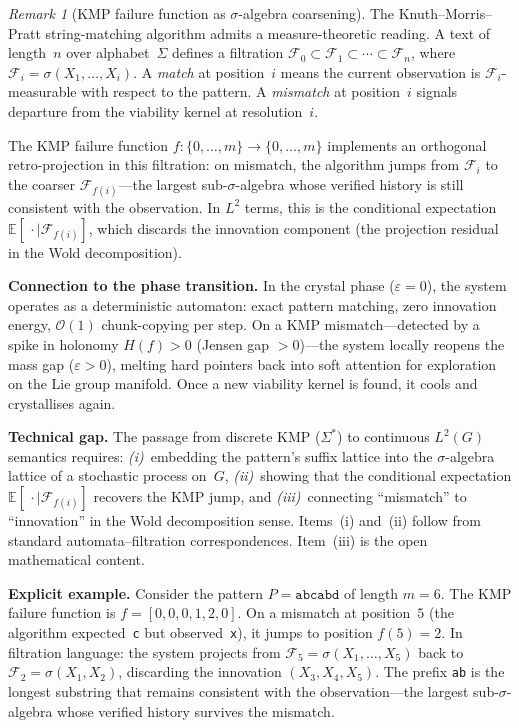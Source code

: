 \documentclass[11pt,a4paper]{article}
\theoremstyle{definition}
\theoremstyle{remark}
\newtheorem{remark}[theorem]{Remark}
\begin{document}
\begin{remark}[KMP failure function as $\sigma$-algebra coarsening]
\label{rmk:kmp}
The Knuth--Morris--Pratt string-matching algorithm admits a
measure-theoretic reading. A text of length~$n$ over alphabet~$\Sigma$
defines a filtration
$\mathcal{F}_0 \subset \mathcal{F}_1 \subset \cdots \subset \mathcal{F}_n$,
where $\mathcal{F}_i = \sigma(X_1,\dots,X_i)$.
A \emph{match} at position~$i$ means the current observation is
$\mathcal{F}_i$-measurable with respect to the pattern.
A \emph{mismatch} at position~$i$ signals departure from the viability
kernel at resolution~$i$.

The KMP failure function $f\colon\{0,\dots,m\}\to\{0,\dots,m\}$
implements an orthogonal retro-projection in this filtration:
on mismatch, the algorithm jumps from $\mathcal{F}_i$ to the coarser
$\mathcal{F}_{f(i)}$---the largest sub-$\sigma$-algebra whose
verified history is still consistent with the observation.
In $L^2$ terms, this is the conditional expectation
$\mathbb{E}[\,\cdot\mid\mathcal{F}_{f(i)}]$,
which discards the innovation component
(the projection residual in the Wold decomposition).

\medskip\noindent\textbf{Connection to the phase transition.}
In the crystal phase ($\varepsilon = 0$), the system operates as a
deterministic automaton: exact pattern matching, zero innovation energy,
$\mathcal{O}(1)$ chunk-copying per step.
On a KMP mismatch---detected by a spike in holonomy $H(f) > 0$
(Jensen gap $> 0$)---the system locally reopens the mass gap
($\varepsilon > 0$), melting hard pointers back into soft attention
for exploration on the Lie group manifold.
Once a new viability kernel is found, it cools and crystallises again.

\medskip\noindent\textbf{Technical gap.}
The passage from discrete KMP ($\Sigma^*$) to continuous $L^2(G)$
semantics requires:
\emph{(i)}~embedding the pattern's suffix lattice into the
$\sigma$-algebra lattice of a stochastic process on~$G$,
\emph{(ii)}~showing that the conditional expectation
$\mathbb{E}[\,\cdot\mid\mathcal{F}_{f(i)}]$ recovers the KMP jump,
and
\emph{(iii)}~connecting ``mismatch'' to ``innovation'' in the Wold
decomposition sense.
Items~(i) and~(ii) follow from standard automata--filtration
correspondences.
Item~(iii) is the open mathematical content.

\medskip\noindent\textbf{Explicit example.}
Consider the pattern $P = \texttt{abcabd}$ of length $m = 6$.
The KMP failure function is $f = [0,0,0,1,2,0]$.
On a mismatch at position~$5$ (the algorithm expected~\texttt{c} but
observed~\texttt{x}), it jumps to position $f(5) = 2$.
In filtration language: the system projects from
$\mathcal{F}_5 = \sigma(X_1,\dots,X_5)$ back to
$\mathcal{F}_2 = \sigma(X_1,X_2)$, discarding the innovation
$(X_3,X_4,X_5)$.
The prefix \texttt{ab} is the longest substring that remains
consistent with the observation---the largest sub-$\sigma$-algebra
whose verified history survives the mismatch.


\end{remark}
\end{document}
